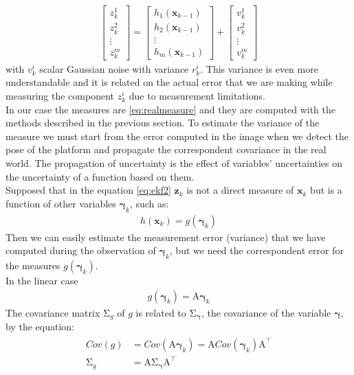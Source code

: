 \begin{align}
{\begin{bmatrix}
z_k^1 \\[10pt]
z_k^2 \\[10pt]
\vdots \\[10pt]
z_k^m
\end{bmatrix}}=
{\begin{bmatrix}
 h_1(\boldsymbol{x}_{k-1}) \\[10pt]
h_2(\boldsymbol{x}_{k-1})  \\[10pt]
\vdots \\[10pt]
h_m(\boldsymbol{x}_{k-1}) 
\end{bmatrix}} 
+ 
{\begin{bmatrix}
v_k^1 \\[10pt]
v_k^2 \\[10pt]
\vdots \\[10pt]
v_k^m
\end{bmatrix}}
\end{align}
with $v_k^i$ scalar Gaussian noise with variance $r_k^i$. This variance is even more understandable and it is related on the actual error that we are making while measuring the component $z_k^i$ due to measurement limitations.\\
In our case the measures are \ref{eq:realmeasure} and they are computed with the methods described in the previous section. To estimate the variance of the measure we must start from the error computed in the image when we detect the pose of the platform and propagate the correspondent covariance in the real world. The propagation of uncertainty is the effect of variables'  uncertainties on the uncertainty of a function based on them.\\
Supposed that in the equation \ref{eq:ekf2} $\boldsymbol{z}_k$ is not a direct measure of $\boldsymbol{x}_{k}$
but is a function of other variables $\boldsymbol{\gamma}_k$, such as:
\begin{align}
h(\boldsymbol{x}_{k}) = g(\boldsymbol{\gamma}_k)
\end{align}
Then we can easily estimate the measurement error (variance) that we have computed during the observation of  $\boldsymbol{\gamma}_k$, but we need the correspondent error for the measures $ g(\boldsymbol{\gamma}_k)$.\\

In the linear case 
\begin{align}
g(\boldsymbol{\gamma}_k) = \mathrm {A}\boldsymbol{\gamma}_k
\end{align}
The covariance matrix $\mathrm {\Sigma }_g$ of $g$ is related to $\mathrm {\Sigma }_{\boldsymbol{\gamma}}$, the covariance of the variable $\boldsymbol{\gamma}$, by the equation:
\begin{align}
\begin{split}
Cov(g) &= Cov(\mathrm {A}\boldsymbol{\gamma}_k) = \mathrm {A}Cov(\boldsymbol{\gamma}_k)\mathrm {A} ^{\top} \\
\mathrm {\Sigma }_g &=\mathrm {A} \mathrm {\Sigma }_{\boldsymbol{\gamma}}\mathrm {A} ^{\top}
\end{split}
\end{align}

